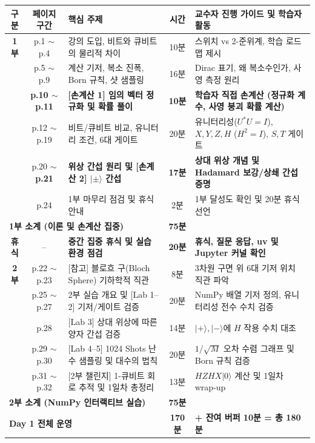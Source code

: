 \documentclass[a4paper,10pt]{article}
\newcommand{\ket}[1]{|#1\rangle}
\begin{document}
\noindent
\small
\begin{tabularx}{\textwidth}{cclcX}
\toprule
\textbf{구분} & \textbf{페이지 구간} & \textbf{핵심 주제} & \textbf{시간} & \textbf{교수자 진행 가이드 및 학습자 활동} \\
\midrule
\textbf{1부} & p.1 $\sim$ p.4 & 강의 도입, 비트와 큐비트의 물리적 차이 & 10분 & 스위치 vs 2-준위계, 학습 로드맵 제시 \\
& p.5 $\sim$ p.9 & 계산 기저, 복소 진폭, Born 규칙, 샷 샘플링 & 16분 & Dirac 표기, 왜 복소수인가, 사영 측정 원리 \\
& \textbf{p.10 $\sim$ p.11} & \textbf{[손계산 1] 임의 벡터 정규화 및 확률 풀이} & \textbf{10분} & \textbf{학습자 직접 손계산 (정규화 계수, 사영 붕괴 확률 계산)} \\
& p.12 $\sim$ p.19 & 비트/큐비트 비교, 유니터리 조건, 6대 게이트 & 20분 & 유니터리성($U^* U = I$), $X, Y, Z, H$ ($H^2=I$), $S, T$ 게이트 \\
& p.20 $\sim$ \textbf{p.21} & \textbf{위상 간섭 원리 및 [손계산 2] $\ket{\pm}$ 간섭} & \textbf{17분} & \textbf{상대 위상 개념 및 Hadamard 보강/상쇄 간섭 증명} \\
& p.24 & 1부 마무리 점검 및 휴식 안내 & 2분 & 1부 달성도 확인 및 20분 휴식 선언 \\
\midrule
\multicolumn{3}{l}{\textbf{1부 소계 (이론 및 손계산 집중)}} & \textbf{75분} & \\
\midrule
\textbf{휴식} & -- & \textbf{중간 집중 휴식 및 실습 환경 점검} & \textbf{20분} & \textbf{휴식, 질문 응답, uv 및 Jupyter 커널 확인} \\
\midrule
\textbf{2부} & p.22 $\sim$ p.23 & [참고] 블로흐 구(Bloch Sphere) 기하학적 직관 & 8분 & 3차원 구면 위 6대 기저 위치 직관 파악 \\
& p.25 $\sim$ p.27 & 2부 실습 개요 및 [Lab 1--2] 기저/게이트 검증 & 20분 & NumPy 배열 기저 정의, 유니터리성 전수 수치 검증 \\
& p.28 & [Lab 3] 상대 위상에 따른 양자 간섭 검증 & 14분 & $\ket{+}, \ket{-}$에 $H$ 작용 수치 대조 \\
& p.29 $\sim$ p.30 & [Lab 4--5] 1024 Shots 난수 샘플링 및 대수의 법칙 & 20분 & $1/\sqrt{M}$ 오차 수렴 그래프 및 Born 규칙 검증 \\
& p.31 $\sim$ p.32 & [2부 챌린지] 1-큐비트 회로 추적 및 1일차 총정리 & 13분 & $HZHX\ket{0}$ 계산 및 1일차 wrap-up \\
\midrule
\multicolumn{3}{l}{\textbf{2부 소계 (NumPy 인터랙티브 실습)}} & \textbf{75분} & \\
\midrule
\multicolumn{3}{l}{\textbf{Day 1 전체 운영}} & \textbf{170분} & \textbf{+ 잔여 버퍼 10분 = 총 180분} \\
\bottomrule
\end{tabularx}
\end{document}
